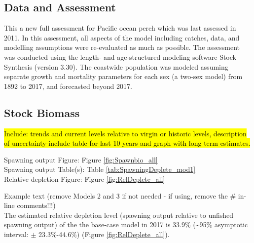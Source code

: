 \documentclass[12pt,]{article}
\begin{document}
\subsection*{Data and Assessment}\label{data-and-assessment}

This a new full assessment for Pacific ocean perch which was last
assessed in 2011. In this assessment, all aspects of the model including
catches, data, and modelling assumptions were re-evaluated as much as
possible. The assessment was conducted using the length- and
age-structured modeling software Stock Synthesis (version 3.30). The
coastwide population was modeled assuming separate growth and mortality
parameters for each sex (a two-sex model) from 1892 to 2017, and
forecasted beyond 2017.

\FloatBarrier

\subsection*{Stock Biomass}\label{stock-biomass}

\hl{Include: trends and current levels relative to virgin or historic levels, 
description of uncertainty-include table for last 10 years and graph with 
long term estimates.}

Spawning output Figure: Figure \ref{fig:Spawnbio_all}\\
Spawning output Table(s): Table \ref{tab:SpawningDeplete_mod1}\\
Relative depletion Figure: Figure \ref{fig:RelDeplete_all}

Example text (remove Models 2 and 3 if not needed - if using, remove the
\# in-line comments!!!)\\
The estimated relative depletion level (spawning output relative to
unfished spawning output) of the the base-case model in 2017 is 33.9\%
(\textasciitilde{}95\% asymptotic interval: \(\pm\) 23.3\%-44.6\%)
(Figure \ref{fig:RelDeplete_all}).

\FloatBarrier
\end{document}
